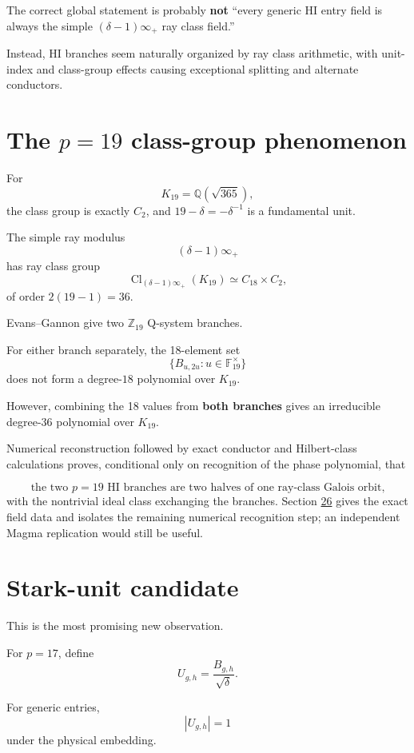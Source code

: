 \documentclass[11pt,reqno]{amsart}
\theoremstyle{plain}
\begin{document}
The correct global statement is probably \textbf{not}
``every generic HI entry field is always the simple \((\delta-1)\infty_+\) ray class field.''

Instead, HI branches seem naturally organized by ray class arithmetic, with unit-index and class-group effects causing exceptional splitting and alternate conductors.

\section{\texorpdfstring{The \(p=19\) class-group phenomenon}{The p=19 class-group phenomenon}}\label{sec:10}

For
\[
K_{19}
=
\mathbb Q(\sqrt{365}),
\]
the class group is exactly \(C_2\), and \(19-\delta=-\delta^{-1}\) is a fundamental unit.

The simple ray modulus
\[
(\delta-1)\infty_+
\]
has ray class group
\[
\operatorname{Cl}_{(\delta-1)\infty_+}(K_{19})
\simeq C_{18}\times C_2,
\]
of order \(2(19-1)=36\).

Evans--Gannon give two \(\mathbb Z_{19}\) Q-system branches.

For either branch separately, the 18-element set
\[
\{B_{u,2u}:u\in\mathbb F_{19}^\times\}
\]
does not form a degree-\(18\) polynomial over \(K_{19}\).

However, combining the 18 values from \textbf{both branches} gives an irreducible degree-\(36\) polynomial over \(K_{19}\).

Numerical reconstruction followed by exact conductor and Hilbert-class calculations proves, conditional only on recognition of the phase polynomial, that

\[
\boxed{
\text{the two \(p=19\) HI branches are two halves of one ray-class Galois orbit,}
}
\]
with the nontrivial ideal class exchanging the branches. Section \hyperref[sec:26]{26} gives the exact field data and isolates the remaining numerical recognition step; an independent Magma replication would still be useful.

\section{Stark-unit candidate}\label{sec:11}

This is the most promising new observation.

For \(p=17\), define
\[
U_{g,h}
=
\frac{B_{g,h}}{\sqrt{\delta}}.
\]

For generic entries,
\[
|U_{g,h}|=1
\]
under the physical embedding.
\end{document}
